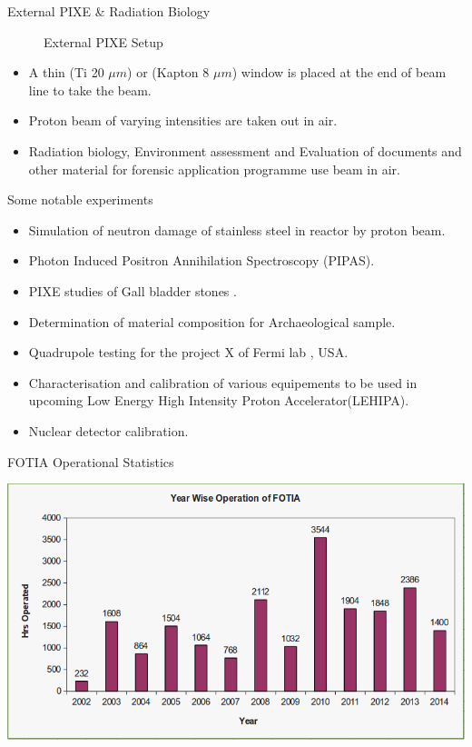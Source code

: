 \documentclass[11pt]{beamer}
\begin{document}
\begin{frame}{External PIXE \& Radiation Biology}
\begin{figure}
        \caption{External PIXE Setup}\label{fig:External PIXE Setup}
\end{figure}
  
  
  \begin{itemize}
     
    
    \item A thin (Ti 20 $\mu m$) or (Kapton 8 $\mu m$) window is placed at the end of beam line to take the beam. 
	\item Proton beam of varying intensities are taken out in air.
	\item Radiation biology, Environment assessment and Evaluation of documents and other material for forensic application  programme use beam in air.
	           
   \end{itemize}


\end{frame}


\begin{frame}{Some notable experiments}
  
  
  \begin{itemize}
     
    
    \item Simulation of neutron damage of stainless steel in reactor by proton beam. 
	\item Photon Induced Positron Annihilation Spectroscopy (PIPAS).
	\item PIXE studies of Gall bladder stones .
	\item Determination of material composition for Archaeological sample.
	\item Quadrupole testing for the project X of Fermi lab , USA.          
    \item Characterisation and calibration of various equipements to be used in upcoming Low Energy High Intensity Proton Accelerator(LEHIPA).
    \item Nuclear detector calibration.
   \end{itemize}


\end{frame}

\begin{frame}{FOTIA Operational Statistics}
  
  
  \includegraphics[width=\linewidth]{operational_data.png}


\end{frame}
\end{document}
